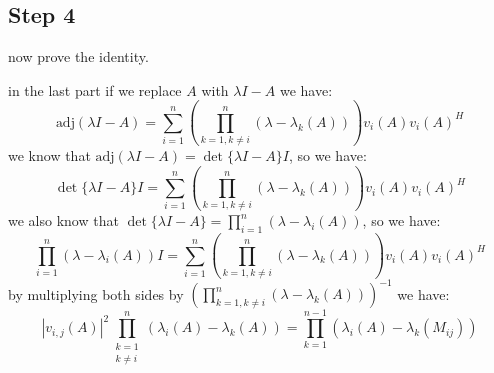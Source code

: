 \subsection{Step 4}
now prove the identity.
\begin{qsolve}
	\begin{qsolve}[]
		in the last part if we replace $A$ with $\lambda I - A$ we have:
		$$\text{adj}(\lambda I - A) = \sum_{i=1}^{n} \left(\prod_{k=1,k\neq i}^{n}(\lambda - \lambda_k(A))\right) v_i(A)v_i(A)^H$$
		we know that $\text{adj}(\lambda I - A) = \det\{\lambda I - A\}I$, so we have:
		$$\det\{\lambda I - A\}I = \sum_{i=1}^{n} \left(\prod_{k=1,k\neq i}^{n}(\lambda - \lambda_k(A))\right) v_i(A)v_i(A)^H$$
		we also know that $\det\{\lambda I - A\} = \prod_{i=1}^{n} (\lambda - \lambda_i(A))$, so we have:
		$$\prod_{i=1}^{n} (\lambda - \lambda_i(A))I = \sum_{i=1}^{n} \left(\prod_{k=1,k\neq i}^{n}(\lambda - \lambda_k(A))\right) v_i(A)v_i(A)^H$$
		by multiplying both sides by $\left(\prod_{k=1,k\neq i}^{n}(\lambda - \lambda_k(A))\right)^{-1}$ we have:
		$$\left| v_{i,j}(A) \right|^2 \prod_{\substack{k=1 \\ k \neq i}}^{n} \left( \lambda_i(A) - \lambda_k(A) \right) = \prod_{k=1}^{n-1} \left( \lambda_i(A) - \lambda_k(M_{ij}) \right)$$
		
	\end{qsolve}
\end{qsolve}

